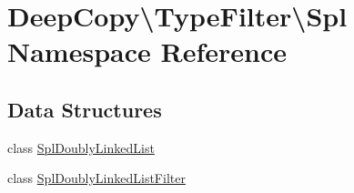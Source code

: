 \hypertarget{namespace_deep_copy_1_1_type_filter_1_1_spl}{}\section{Deep\+Copy\textbackslash{}Type\+Filter\textbackslash{}Spl Namespace Reference}
\label{namespace_deep_copy_1_1_type_filter_1_1_spl}
\subsection*{Data Structures}
\begin{DoxyCompactItemize}
\item 
class \mbox{\hyperlink{class_deep_copy_1_1_type_filter_1_1_spl_1_1_spl_doubly_linked_list}{Spl\+Doubly\+Linked\+List}}
\item 
class \mbox{\hyperlink{class_deep_copy_1_1_type_filter_1_1_spl_1_1_spl_doubly_linked_list_filter}{Spl\+Doubly\+Linked\+List\+Filter}}
\end{DoxyCompactItemize}
